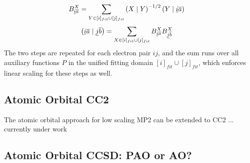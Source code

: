 \begin{equation}
B^{X}_{\underline{i}\overline{a}} = \sum_{Y \in [i]_{fit} \cup [j]_{fit}} \left( X \mid Y \right)^{-1/2} \left( Y \mid \underline{i}\overline{a} \right)
\end{equation}
\begin{equation}
\left( \underline{i}\overline{a} \mid \underline{j}\overline{b} \right) = \sum_{X \in [i]_{fit} \cup [j]_{fit}} B^{X}_{\underline{i}\overline{a}} B^{X}_{\underline{j}\overline{b}} 
\end{equation}
\noindent The two steps are repeated for each electron pair $ij$, and the sum runs over all auxiliary functions $P$ in the unified fitting domain $[i]_{fit} \cup [j]_{fit}$, which enforces linear scaling for these steps as well. 


\subsection{Atomic Orbital CC2}

The atomic orbital approach for low scaling MP2 can be extended to CC2 ... currently under work

\subsection{Atomic Orbital CCSD: PAO or AO?}

